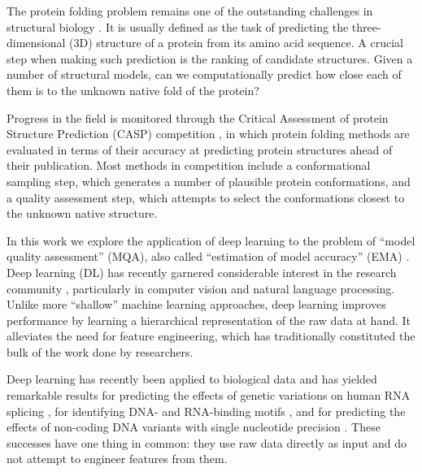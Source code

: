 
The protein folding problem remains one of the outstanding challenges
in structural biology \cite{dill2012folding}.  It is usually defined
as the task of predicting the three-dimensional (3D) structure of a
protein from its amino acid sequence. A crucial step when making such
prediction is the ranking of candidate structures. Given a number of
structural models, can we computationally predict how close each of
them is to the unknown native fold of the protein?

Progress in the field is monitored through the Critical Assessment of
protein Structure Prediction (CASP) competition \cite{moult1995large},
in which protein folding methods are evaluated in terms of their
accuracy at predicting protein structures ahead of their
publication. Most methods in competition include a conformational
sampling step, which generates a number of plausible protein
conformations, and a quality assessment step, which attempts to select
the conformations closest to the unknown native structure.

In this work we explore the application of deep learning to the
problem of ``model quality assessment'' (MQA), also called
``estimation of model accuracy'' (EMA) \cite{kryshtafovych2015}. Deep
learning (DL) has recently garnered considerable interest in the
research community \cite{lecun2015deep}, particularly in computer
vision and natural language processing. Unlike more ``shallow''
machine learning approaches, deep learning improves performance by
learning a hierarchical representation of the raw data at hand. It
alleviates the need for feature engineering, which has traditionally
constituted the bulk of the work done by researchers.

Deep learning has recently been applied to biological data and has
yielded remarkable results for predicting the effects of genetic
variations on human RNA splicing \cite{xiong2015human}, for
identifying DNA- and RNA-binding
motifs \cite{alipanahi2015predicting}, and for predicting the effects
of non-coding DNA variants with single nucleotide
precision \cite{zhou2015predicting}. These successes have one thing in
common: they use raw data directly as input and do not attempt to
engineer features from them.

